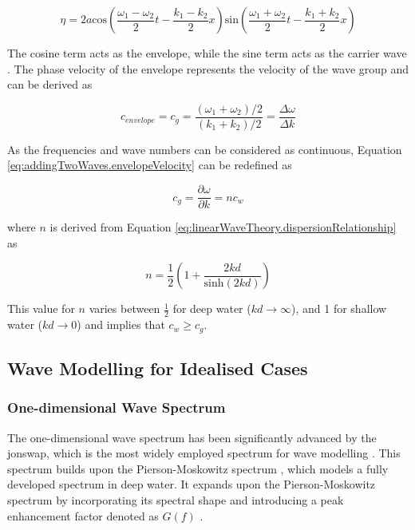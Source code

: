 \begin{equation} \label{eq:addingTwoWaves.envelopeForm}
    \eta =  2a\text{cos} \left ( \frac{\omega_{1} - \omega_{2}}{2}t - \frac{k_{1} - k_{2}}{2}x \right ) \text{sin} \left ( \frac{\omega_{1} + \omega_{2}}{2}t - \frac{k_{1} + k_{2}}{2}x  \right )
\end{equation}

The cosine term acts as the envelope, while the sine term acts as the carrier wave \cite{Holthuijsen2007}. The phase velocity of the envelope represents the velocity of the wave group and can be derived as

\begin{equation} \label{eq:addingTwoWaves.envelopeVelocity}
    c_{envelope} = c_{g} = \frac{(\omega_{1} + \omega_{2})/2}{(k_1 + k_2)/2} = \frac{\Delta \omega}{\Delta k}
\end{equation}

As the frequencies and wave numbers can be considered as continuous, Equation \ref{eq:addingTwoWaves.envelopeVelocity} can be redefined as

\begin{equation} \label{eq:addingTwoWaves.groupVelocity}
    c_{g} = \frac{\partial \omega}{\partial k} = nc_{w}
\end{equation}

where $n$ is derived from Equation \ref{eq:linearWaveTheory.dispersionRelationship} \cite{Holthuijsen2007} as 

\begin{equation} \label{eq:addingTwoWaves.n}
    n = \frac{1}{2} \left ( 1+ \frac{2kd}{\text{sinh}(2kd)} \right )
\end{equation}

This value for $n$ varies between $\frac{1}{2}$ for deep water ($kd \to \infty$), and 1 for shallow water \cite{Holthuijsen2007} ($kd \to 0$) and implies that $c_{w} \geq c_{g}$. 

\subsection{Wave Modelling for Idealised Cases} \label{subsec:theory.waves.modelling}

\subsubsection{One-dimensional Wave Spectrum} \label{subsubsec:theory.waves.modelling.1D}

The one-dimensional wave spectrum has been significantly advanced by the \acf{jonswap}, which is the most widely employed spectrum for wave modelling \cite{Holthuijsen2007}. This spectrum builds upon the Pierson-Moskowitz spectrum \cite{Pierson1964}, which models a fully developed spectrum in deep water. It expands upon the Pierson-Moskowitz spectrum by incorporating its spectral shape and introducing a peak enhancement factor denoted as $G(f)$ \cite{Hasselmann1973JONSWAP,Hasselmann1974JONSWAP}.

